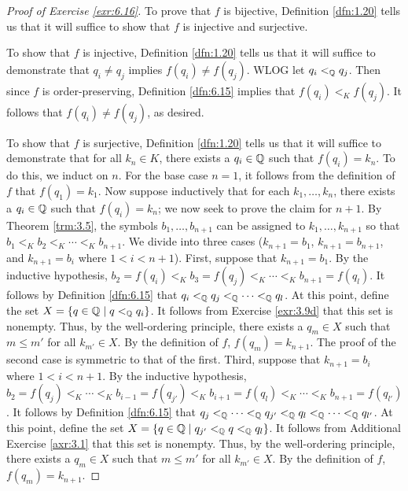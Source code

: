 \documentclass[../main.tex]{subfiles}
\begin{document}
\begin{exercise}
\begin{proof}[Proof of Exercise \ref{exr:6.16}]
        To prove that $f$ is bijective, Definition \ref{dfn:1.20} tells us that it will suffice to show that $f$ is injective and surjective.\par
        To show that $f$ is injective, Definition \ref{dfn:1.20} tells us that it will suffice to demonstrate that $q_i\neq q_j$ implies $f(q_i)\neq f(q_j)$. WLOG let $q_i<_{\mathbb{Q}} q_j$. Then since $f$ is order-preserving, Definition \ref{dfn:6.15} implies that $f(q_i)<_Kf(q_j)$. It follows that $f(q_i)\neq f(q_j)$, as desired.\par
        To show that $f$ is surjective, Definition \ref{dfn:1.20} tells us that it will suffice to demonstrate that for all $k_n\in K$, there exists a $q_i\in\mathbb{Q}$ such that $f(q_i)=k_n$. To do this, we induct on $n$. For the base case $n=1$, it follows from the definition of $f$ that $f(q_1)=k_1$. Now suppose inductively that for each $k_1,\dots,k_n$, there exists a $q_i\in\mathbb{Q}$ such that $f(q_i)=k_n$; we now seek to prove the claim for $n+1$. By Theorem \ref{trm:3.5}, the symbols $b_1,\dots,b_{n+1}$ can be assigned to $k_1,\dots,k_{n+1}$ so that $b_1<_Kb_2<_K\cdots<_Kb_{n+1}$. We divide into three cases ($k_{n+1}=b_1$, $k_{n+1}=b_{n+1}$, and $k_{n+1}=b_i$ where $1<i<n+1$). First, suppose that $k_{n+1}=b_1$. By the inductive hypothesis, $b_2=f(q_i)<_Kb_3=f(q_j)<_K\cdots<_Kb_{n+1}=f(q_l)$. It follows by Definition \ref{dfn:6.15} that $q_i<_{\mathbb{Q}} q_j<_{\mathbb{Q}} \cdots<_{\mathbb{Q}} q_l$. At this point, define the set $X=\{q\in\mathbb{Q}\mid q<_{\mathbb{Q}} q_i\}$. It follows from Exercise \ref{exr:3.9d} that this set is nonempty. Thus, by the well-ordering principle, there exists a $q_m\in X$ such that $m\leq m'$ for all $k_{m'}\in X$. By the definition of $f$, $f(q_m)=k_{n+1}$. The proof of the second case is symmetric to that of the first. Third, suppose that $k_{n+1}=b_i$ where $1<i<n+1$. By the inductive hypothesis, $b_2=f(q_j)<_K\cdots<_Kb_{i-1}=f(q_{j'})<_Kb_{i+1}=f(q_l)<_K\cdots<_Kb_{n+1}=f(q_{l'})$. It follows by Definition \ref{dfn:6.15} that $q_j<_{\mathbb{Q}} \cdots<_{\mathbb{Q}} q_{j'}<_{\mathbb{Q}} q_l<_{\mathbb{Q}} \cdots<_{\mathbb{Q}} q_{l'}$. At this point, define the set $X=\{q\in\mathbb{Q}\mid q_{j'}<_{\mathbb{Q}} q<_{\mathbb{Q}} q_l\}$. It follows from Additional Exercise \ref{axr:3.1} that this set is nonempty. Thus, by the well-ordering principle, there exists a $q_m\in X$ such that $m\leq m'$ for all $k_{m'}\in X$. By the definition of $f$, $f(q_m)=k_{n+1}$.
    \end{proof}
\end{exercise}
\end{document}
